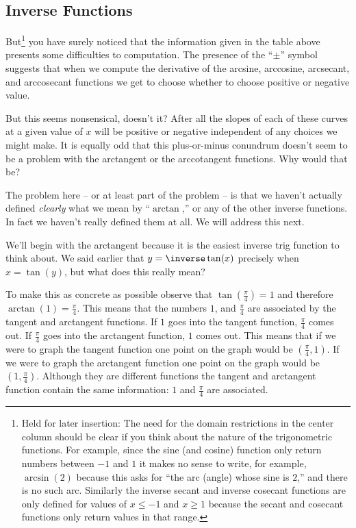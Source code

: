 
\subsection{ Inverse Functions}
\label{sec:InvFunctions}


But\footnote{Held for later insertion: The need for the domain
restrictions in the center column should be clear if you think about
the nature of the trigonometric functions. For example, since
the sine (and cosine) function only return numbers between $-1$ and
$1$ it makes no sense to write, for example, $\arcsin(2)$ because this
asks for ``the arc (angle) whose sine is $2$,'' and there is no such
arc.  Similarly the inverse secant and inverse
cosecant functions are only defined for values of $x\le -1$ and
$x\ge1$ because the secant and cosecant functions only return values
in that range.
} you have surely noticed that the information given in the
table above presents some difficulties to
computation. The presence of the ``$\pm$'' symbol suggests that when
we compute the derivative of the arcsine, arccosine, arcsecant, and
arccosecant functions we get to choose whether to choose positive or
negative value.

But this seems nonsensical, doesn't it? After all the slopes of each
of these curves at a given value of $x$ will be positive or negative
independent of any choices we might make. It is equally odd that
this plus-or-minus conundrum doesn't seem to be a problem with the
arctangent or the arccotangent functions. Why would that be?

The problem here -- or at least part of the problem -- is that we
haven't actually defined \emph{clearly} what we mean by
``$\arctan$,'' or any of the other inverse  functions. In fact we
haven't really defined them at all.
We will
address this next.

We'll begin with the arctangent because it is the easiest inverse trig
function to think about. We said earlier that $y=\inverse\tan(x)$
precisely when $x=\tan(y)$, but what does this really mean?

To make this as concrete as possible observe that
$\tan\left(\frac{\pi}{4}\right)=1$ and therefore
$\arctan(1)=\frac{\pi}{4}$. This means that the numbers $1$, and
$\frac{\pi}{4}$ are associated by the tangent and arctangent
functions. If $1$ goes into the tangent function, $\frac{\pi}{4}$
comes out. If $\frac{\pi}{4}$ goes into the arctangent function, $1$
comes out.  This means that if we were to graph the tangent function
one point on the graph would be $\left(\frac{\pi}{4}, 1\right)$. If we
were to graph the arctangent function one point on the graph would be
$\left(1, \frac{\pi}{4}\right)$. Although they are different functions
the tangent and arctangent function contain the same information:
$1$ and $\frac{\pi}{4}$ are associated.

